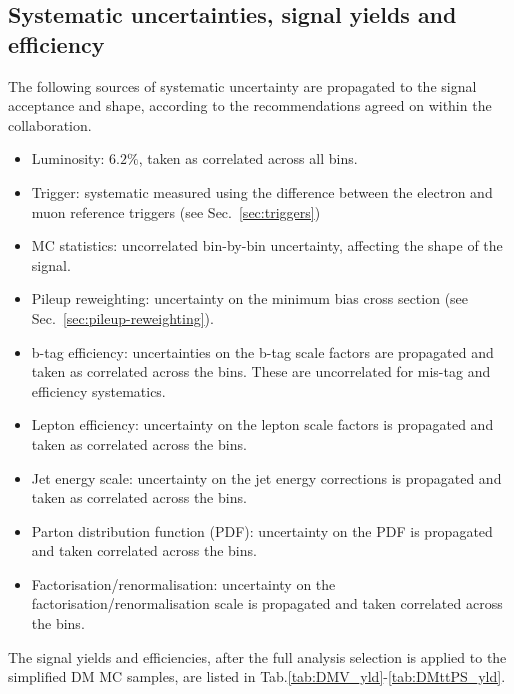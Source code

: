 \subsection{Systematic uncertainties, signal yields and efficiency}
\label{sec:systs-darkmatter}
The following sources of systematic uncertainty are propagated to the signal 
acceptance and shape, according to the recommendations agreed on within the
collaboration.
\begin{itemize}
    \item Luminosity: $6.2\%$, taken as correlated across all bins.
    \item Trigger: systematic measured using the difference between the electron
        and muon reference triggers (see Sec.~\ref{sec:triggers})
    \item MC statistics: uncorrelated bin-by-bin uncertainty, affecting the 
        shape of the signal. 
    \item Pileup reweighting: uncertainty on the minimum bias cross section 
        (see Sec.~\ref{sec:pileup-reweighting}).
    \item b-tag efficiency: uncertainties on the b-tag scale factors are 
        propagated and taken as correlated across the bins. These are 
        uncorrelated for mis-tag and efficiency systematics.
    \item Lepton efficiency: uncertainty on the lepton scale factors is 
        propagated and taken as correlated across the bins. 
    \item Jet energy scale: uncertainty on the jet energy corrections is 
        propagated and taken as correlated across the bins.
    \item Parton distribution function (PDF): uncertainty on the PDF is
        propagated and taken correlated across the bins.
    \item Factorisation/renormalisation: uncertainty on the 
        factorisation/renormalisation scale is propagated and taken correlated
        across the bins.
\end{itemize}

The signal yields and efficiencies, after the full analysis selection is applied
to the simplified DM MC samples, are listed in Tab.\ref{tab:DMV_yld}-\ref{tab:DMttPS_yld}.

\clearpage

